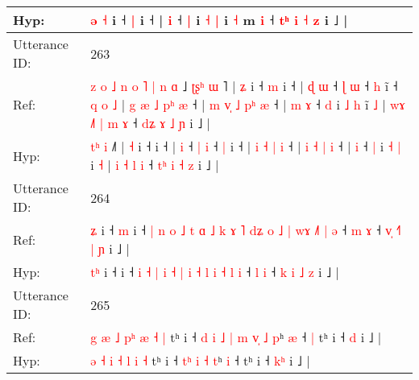 \documentclass[10pt]{article}
\DeclareRobustCommand{\hl}[1]{{\textcolor{red}{#1}}}
\begin{document}
\begin{longtable}{ll}
 \\
Hyp: & \hl{}\hl{}\hl{}\hl{}\hl{}\hl{}\hl{}\hl{}\hl{}\hl{}\hl{}\hl{}\hl{}\hl{}\hl{}\hl{}\hl{}\hl{}\hl{}\hl{}\hl{}\hl{ə} \hl{˧} i ˧ \hl{|} i ˧ |\hl{}\hl{} \hl{i} ˧ \hl{|} i \hl{˧} \hl{|} i\hl{}\hl{}\hl{} \hl{˧} m \hl{i} ˧ \hl{t}\hl{ʰ} \hl{i} \hl{˧} \hl{z} i ˩ |
 \\
\midrule
Utterance ID: & 263 \\
Ref: & \hl{z}\hl{ }\hl{o}\hl{ }\hl{˩}\hl{ }\hl{n}\hl{ }\hl{o}\hl{ }\hl{˥}\hl{ }\hl{|}\hl{ }\hl{n} \hl{ɑ} ˩\hl{ }\hl{ʈ}\hl{ʂ}\hl{ʰ}\hl{ }\hl{ɯ}\hl{ }˥ | \hl{ʑ} i ˧\hl{ }\hl{m} i ˧ |\hl{ }\hl{ɖ} \hl{ɯ} ˧ \hl{ɭ} \hl{ɯ} ˧ \hl{h} i\hl{̃} ˧\hl{ }\hl{q}\hl{ }\hl{o}\hl{ }\hl{˩} |\hl{ }\hl{g} \hl{æ} \hl{˩} \hl{p}\hl{ʰ} \hl{æ} ˧ |\hl{ }\hl{m} \hl{v}\hl{̩} \hl{˩} \hl{p}\hl{ʰ} \hl{æ} ˧ |\hl{ }\hl{m} \hl{ɤ} ˧ \hl{d} i \hl{˩} \hl{h} i\hl{̃} \hl{˩} |\hl{ }\hl{w}\hl{ɤ} \hl{˩}\hl{˥} \hl{|} \hl{m} \hl{ɤ} ˧ \hl{d}\hl{ʑ} \hl{ɤ} \hl{˩} \hl{ɲ} i ˩ |
 \\
Hyp: & \hl{}\hl{}\hl{}\hl{}\hl{}\hl{}\hl{}\hl{}\hl{}\hl{}\hl{}\hl{}\hl{}\hl{t}\hl{ʰ} \hl{i} ˩\hl{}\hl{}\hl{}\hl{}\hl{}\hl{}\hl{}˥ | \hl{˧} i ˧\hl{}\hl{} i ˧ |\hl{}\hl{} \hl{i} ˧ \hl{|} \hl{i} ˧ \hl{|} i\hl{} ˧\hl{}\hl{}\hl{}\hl{}\hl{}\hl{} |\hl{}\hl{} \hl{i} \hl{˧} \hl{}\hl{|} \hl{i} ˧ |\hl{}\hl{} \hl{}\hl{i} \hl{˧} \hl{}\hl{|} \hl{i} ˧ |\hl{}\hl{} \hl{i} ˧ \hl{|} i \hl{˧} \hl{|} i\hl{} \hl{˧} |\hl{}\hl{}\hl{} \hl{}\hl{i} \hl{˧} \hl{l} \hl{i} ˧ \hl{t}\hl{ʰ} \hl{i} \hl{˧} \hl{z} i ˩ |
 \\
\midrule
Utterance ID: & 264 \\
Ref: & \hl{}\hl{ʑ} i ˧\hl{ }\hl{m} i ˧\hl{ }\hl{|}\hl{ }\hl{n}\hl{ }\hl{o}\hl{ }\hl{˩}\hl{ }\hl{t} \hl{ɑ} \hl{˩} \hl{k} \hl{ɤ} \hl{˥} \hl{d}\hl{ʑ} \hl{o} \hl{˩} \hl{|} \hl{w}\hl{ɤ} \hl{˩}\hl{˥} \hl{|} \hl{ə} ˧ \hl{m} \hl{ɤ} ˧ \hl{v}\hl{̩} \hl{˧}\hl{˥} \hl{|} \hl{ɲ} i ˩ |
 \\
Hyp: & \hl{t}\hl{ʰ} i ˧\hl{}\hl{} i ˧\hl{}\hl{}\hl{}\hl{}\hl{}\hl{}\hl{}\hl{}\hl{}\hl{} \hl{i} \hl{˧} \hl{|} \hl{i} \hl{˧} \hl{}\hl{|} \hl{i} \hl{˧} \hl{l} \hl{}\hl{i} \hl{}\hl{˧} \hl{l} \hl{i} ˧ \hl{l} \hl{i} ˧ \hl{}\hl{k} \hl{}\hl{i} \hl{˩} \hl{z} i ˩ |
 \\
\midrule
Utterance ID: & 265 \\
Ref: & \hl{g} \hl{æ} \hl{˩} \hl{p}\hl{ʰ} \hl{æ} \hl{˧} \hl{|} tʰ i ˧\hl{ }\hl{d}\hl{ }\hl{i}\hl{ }\hl{˩} \hl{|}\hl{ }\hl{m} \hl{v}\hl{̩} \hl{˩} \hl{p}ʰ \hl{æ} ˧\hl{ }\hl{|} tʰ i ˧ \hl{}\hl{d} i ˩ |
 \\
Hyp: & \hl{ə} \hl{˧} \hl{i} \hl{}\hl{˧} \hl{l} \hl{i} \hl{˧} tʰ i ˧\hl{}\hl{}\hl{}\hl{}\hl{}\hl{} \hl{}\hl{t}\hl{ʰ} \hl{}\hl{i} \hl{˧} \hl{t}ʰ \hl{i} ˧\hl{}\hl{} tʰ i ˧ \hl{k}\hl{ʰ} i ˩ |

\end{longtable}
\end{document}
